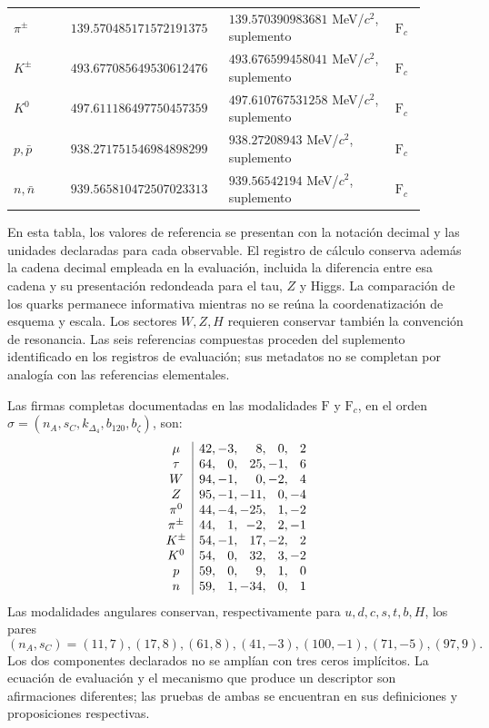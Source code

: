 \begin{table}[!htbp]
\begin{tabular}{p{0.13\linewidth}p{0.32\linewidth}p{0.38\linewidth}p{0.07\linewidth}}
\(\pi^\pm\) & \(139.570485171\allowbreak572191375\) & \(139.570390983681\) MeV/\(c^2\), suplemento & \(\mathrm F_c\)\\
\(K^\pm\) & \(493.677085649\allowbreak530612476\) & \(493.676599458041\) MeV/\(c^2\), suplemento & \(\mathrm F_c\)\\
\(K^0\) & \(497.611186497\allowbreak750457359\) & \(497.610767531258\) MeV/\(c^2\), suplemento & \(\mathrm F_c\)\\
\(p,\bar p\) & \(938.271751546\allowbreak984898299\) & \(938.27208943\) MeV/\(c^2\), suplemento & \(\mathrm F_c\)\\
\(n,\bar n\) & \(939.565810472\allowbreak507023313\) & \(939.56542194\) MeV/\(c^2\), suplemento & \(\mathrm F_c\)\\
\end{tabular}
\end{table}
\endgroup

En esta tabla, los valores de referencia se presentan con la notación
decimal y las unidades declaradas para cada observable. El registro de
cálculo conserva además la cadena decimal empleada en la evaluación,
incluida la diferencia entre esa cadena y su presentación redondeada para
el tau, \(Z\) y Higgs. La comparación de los quarks
permanece informativa mientras no se reúna la coordenatización de esquema y escala.
Los sectores \(W,Z,H\) requieren conservar también la convención de
resonancia. Las seis referencias compuestas proceden del suplemento
identificado en los registros de evaluación; sus metadatos no se completan
por analogía con las referencias elementales.

Las firmas completas documentadas en las modalidades \(\mathrm F\) y
\(\mathrm F_c\), en el orden\linebreak
\(\sigma=(n_A,s_C,k_{\Delta_4},b_{120},b_\zeta)\), son:
\[
\begin{array}{c|r@{,\,}r@{,\,}r@{,\,}r@{,\,}r}
\mu&42&-3&8&0&2\\
\tau&64&0&25&-1&6\\
W&94&-1&0&-2&4\\
Z&95&-1&-11&0&-4\\
\pi^0&44&-4&-25&1&-2\\
\pi^\pm&44&1&-2&2&-1\\
K^\pm&54&-1&17&-2&2\\
K^0&54&0&32&3&-2\\
p&59&0&9&1&0\\
n&59&1&-34&0&1
\end{array}
\]
Las modalidades angulares conservan, respectivamente para
\(u,d,c,s,t,b,H\), los pares
\[
(n_A,s_C)=(11,7),(17,8),(61,8),(41,-3),(100,-1),(71,-5),(97,9).
\]
Los dos componentes declarados no se amplían con
tres ceros implícitos. La ecuación de evaluación y el mecanismo que
produce un descriptor son afirmaciones diferentes; las pruebas de ambas
se encuentran en sus definiciones y proposiciones respectivas.

